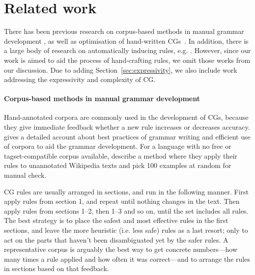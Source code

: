 \section{Related work}
\label{sec:CGanaRelated}

There has been previous research on corpus-based methods in manual
grammar development \cite{voutilainen2004}, as well as optimisation of
hand-written CGs~\cite{bick2013tuning}.  In addition, there is a large
body of research on automatically inducing rules,
e.g. \citet{inducing_cg1996,lindberg_eineborg98ilp,lager01transformation,asfrent14}.
However, since our work is aimed to aid the process of hand-crafting
rules, we omit those works from our discussion. Due to adding
Section~\ref{sec:expressivity}, we also include work addressing the
  expressivity and complexity of CG.


\paragraph{Corpus-based methods in manual grammar development}

Hand-annotated corpora are commonly used in the development of CGs, because they give immediate feedback whether a new rule increases or decreases accuracy.
\citet{voutilainen2004} gives a detailed account about best practices of grammar writing and efficient use of corpora to aid the grammar development.
For a language with no free or tagset-compatible corpus available, \citet{tyers_reynolds2015} describe a method where they apply their rules to unannotated Wikipedia texts and pick 100 examples at random for manual check.

CG rules are usually arranged in sections, and run in the following manner.
First apply rules from section 1, and repeat until nothing changes in the text.
Then apply rules from sections 1--2, then 1--3 and so on, until the set includes
all rules. The best strategy is to place the safest and most effective rules in
the first sections, and leave the more heuristic (i.e. less safe) rules as a
last resort; only to act on the parts that haven't been disambiguated yet by
the safer rules. A representative corpus is arguably the best way to get concrete
numbers---how many times a rule applied and how often it was correct---and to
arrange the rules in sections based on that feedback.

